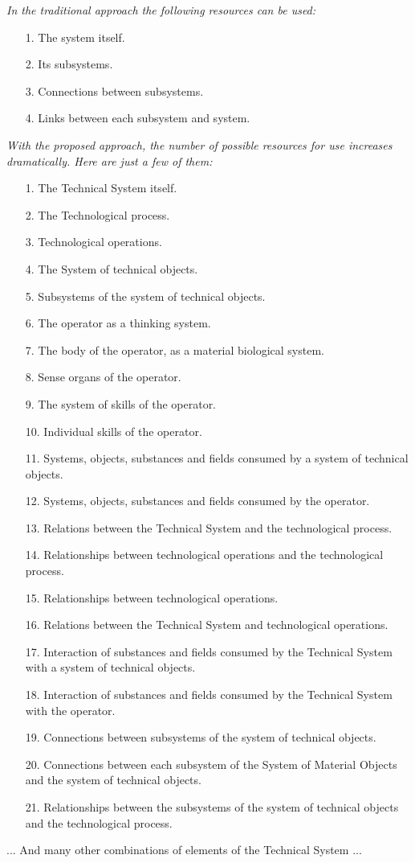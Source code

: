 \documentclass[11pt,a4paper]{article}
\begin{document}
\emph{In the traditional approach the following resources can be used:}
\begin{itemize}[noitemsep]
\item[1.] The system itself.
\item[2.] Its subsystems.  
\item[3.] Connections between subsystems.
\item[4.] Links between each subsystem and
system.  
\end{itemize}
\emph{With the proposed approach, the number of possible resources for use
  increases dramatically. Here are just a few of them:}
\begin{itemize}[noitemsep]
\item[1.] The Technical System itself.
\item[2.] The Technological process.
\item[3.] Technological operations.
\item[4.] The System of technical objects.
\item[5.] Subsystems of the system of technical objects.
\item[6.] The operator as a thinking system.
\item[7.] The body of the operator, as a material biological system.
\item[8.] Sense organs of the operator.
\item[9.] The system of skills of the operator.
\item[10.] Individual skills of the operator.
\item[11.] Systems, objects, substances and fields consumed by a system of
  technical objects.
\item[12.] Systems, objects, substances and fields consumed by the operator.
\item[13.] Relations between the Technical System and the technological
  process.
\item[14.] Relationships between technological operations and the
  technological process.
\item[15.] Relationships between technological operations.
\item[16.] Relations between the Technical System and technological
  operations.
\item[17.] Interaction of substances and fields consumed by the Technical
  System with a system of technical objects.
\item[18.] Interaction of substances and fields consumed by the Technical
  System with the operator.
\item[19.] Connections between subsystems of the system of technical objects.
\item[20.] Connections between each subsystem of the System of Material
  Objects and the system of technical objects.
\item[21.] Relationships between the subsystems of the system of technical
  objects and the technological process.
\end{itemize}
... And many other combinations of elements of the Technical System ...
\end{document}
